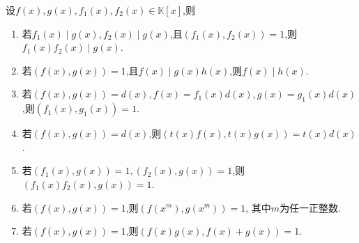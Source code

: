 \documentclass[../../main.tex]{subfiles}%
\begin{document}
\begin{proposition}[互素多项式和最大公因式的基本性质]\label{proposition:互素多项式和最大公因式的基本性质}
设$f(x),g(x),f_1(x),f_2(x)\in \mathbb{K}[x]$,则
\begin{enumerate}[(1)]
\item 若\(f_1(x)\mid g(x), f_2(x)\mid g(x)\),且\((f_1(x), f_2(x)) = 1\),则\(f_1(x)f_2(x)\mid g(x)\).
\item  若\((f(x), g(x)) = 1\),且\(f(x)\mid g(x)h(x)\),则\(f(x)\mid h(x)\).
\item  若\((f(x), g(x)) = d(x), f(x)=f_1(x)d(x), g(x)=g_1(x)d(x)\),则\((f_1(x), g_1(x)) = 1\).
\item  若\((f(x), g(x)) = d(x)\),则\((t(x)f(x), t(x)g(x)) = t(x)d(x)\).
\item\label{proposition:互素多项式和最大公因式的基本性质6}  若\((f_1(x), g(x)) = 1, (f_2(x), g(x)) = 1\),则\((f_1(x)f_2(x), g(x)) = 1\).

\item 若\((f(x),g(x))=1\),则\((f(x^m),g(x^m))=1\), 其中\(m\)为任一正整数.

\item  若\((f(x),g(x)) = 1\),则\((f(x)g(x),f(x)+g(x)) = 1\).
\end{enumerate}
\end{proposition}
\end{document}
